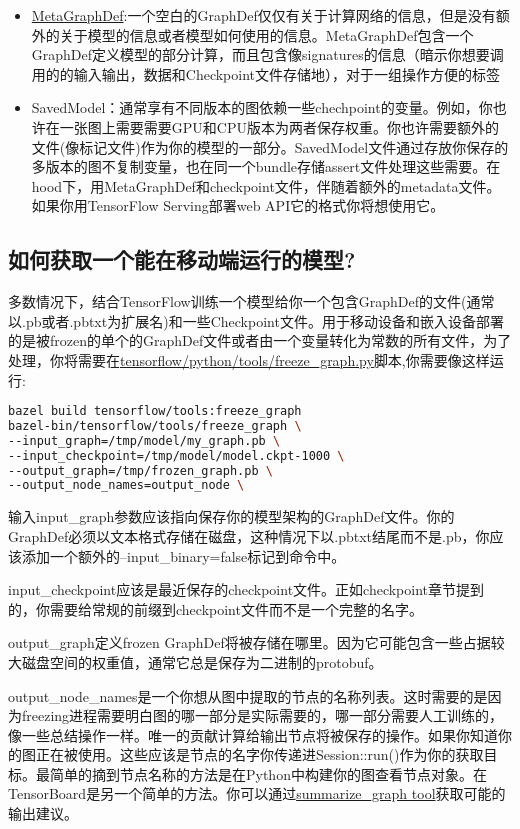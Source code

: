 \begin{itemize}
\item \href{https://www.github.com/tensorflow/tensorflow/blob/r1.4/tensorflow/core/protobuf/meta_graph.proto}{MetaGraphDef}:一个空白的GraphDef仅仅有关于计算网络的信息，但是没有额外的关于模型的信息或者模型如何使用的信息。MetaGraphDef包含一个GraphDef定义模型的部分计算，而且包含像signatures的信息（暗示你想要调用的的输入输出，数据和Checkpoint文件存储地），对于一组操作方便的标签
\item SavedModel：通常享有不同版本的图依赖一些chechpoint的变量。例如，你也许在一张图上需要需要GPU和CPU版本为两者保存权重。你也许需要额外的文件(像标记文件)作为你的模型的一部分。SavedModel文件通过存放你保存的多版本的图不复制变量，也在同一个bundle存储assert文件处理这些需要。在hood下，用MetaGraphDef和checkpoint文件，伴随着额外的metadata文件。如果你用TensorFlow Serving部署web API它的格式你将想使用它。
\end{itemize}
\subsection{如何获取一个能在移动端运行的模型?}
多数情况下，结合TensorFlow训练一个模型给你一个包含GraphDef的文件(通常以.pb或者.pbtxt为扩展名)和一些Checkpoint文件。用于移动设备和嵌入设备部署的是被frozen的单个的GraphDef文件或者由一个变量转化为常数的所有文件，为了处理，你将需要在\href{https://www.github.com/tensorflow/tensorflow/blob/r1.4/tensorflow/python/tools/freeze_graph.py}{tensorflow/python/tools/freeze\_graph.py}脚本,你需要像这样运行:
\begin{lstlisting}[language=Bash]
bazel build tensorflow/tools:freeze_graph
bazel-bin/tensorflow/tools/freeze_graph \
--input_graph=/tmp/model/my_graph.pb \
--input_checkpoint=/tmp/model/model.ckpt-1000 \
--output_graph=/tmp/frozen_graph.pb \
--output_node_names=output_node \
\end{lstlisting}
输入input\_graph参数应该指向保存你的模型架构的GraphDef文件。你的GraphDef必须以文本格式存储在磁盘，这种情况下以.pbtxt结尾而不是.pb，你应该添加一个额外的--input\_binary=false标记到命令中。

input\_checkpoint应该是最近保存的checkpoint文件。正如checkpoint章节提到的，你需要给常规的前缀到checkpoint文件而不是一个完整的名字。

output\_graph定义frozen GraphDef将被存储在哪里。因为它可能包含一些占据较大磁盘空间的权重值，通常它总是保存为二进制的protobuf。

output\_node\_names是一个你想从图中提取的节点的名称列表。这时需要的是因为freezing进程需要明白图的哪一部分是实际需要的，哪一部分需要人工训练的，像一些总结操作一样。唯一的贡献计算给输出节点将被保存的操作。如果你知道你的图正在被使用。这些应该是节点的名字你传递进Session::run()作为你的获取目标。最简单的摘到节点名称的方法是在Python中构建你的图查看节点对象。在TensorBoard是另一个简单的方法。你可以通过\href{https://github.com/tensorflow/tensorflow/tree/master/tensorflow/tools/graph_transforms/README#inspecting-graphs}{summarize\_graph tool}获取可能的输出建议。

